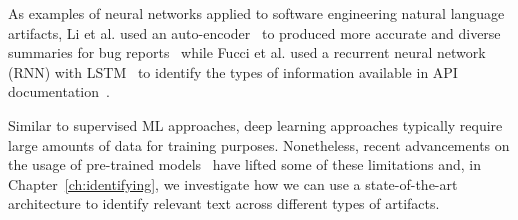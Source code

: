 As examples of neural networks applied to software engineering natural language artifacts,
Li et al. used an auto-encoder~\cite{liou2014autoencoder}
to produced more accurate and diverse summaries 
for bug reports~\cite{li2018deep} while 
Fucci et al. used a 
recurrent neural network (\acs{RNN}) with 
\acf{LSTM}~\cite{hochreiter1997lstm}
to identify the types of information available in 
API documentation~\cite{fucci2019}.



Similar to supervised \acs{ML} approaches, deep learning approaches 
typically require large amounts of data for training purposes.
Nonetheless, recent advancements on the usage of
pre-trained models~\cite{erhan2010pre-train} 
have lifted some of these limitations and,
in Chapter~\ref{ch:identifying},
we investigate how we can use a state-of-the-art architecture 
to identify relevant text across different types of artifacts.






















